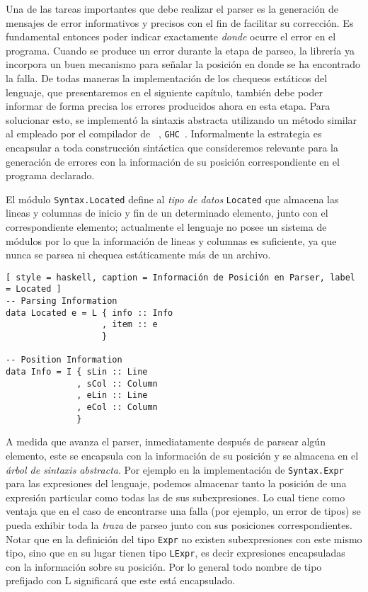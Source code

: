Una de las tareas importantes que debe realizar el parser es la generación de mensajes de error informativos y precisos con el fin de facilitar su corrección. Es fundamental entonces poder indicar exactamente  \textit{donde} ocurre el error en el programa.
Cuando se produce un error durante la etapa de parseo, la librería \Megaparsec{} ya incorpora un buen mecanismo para señalar la posición en donde se ha encontrado la falla.
De todas maneras la implementación de los chequeos estáticos del lenguaje, que presentaremos en el siguiente capítulo, también debe poder informar de forma precisa los errores producidos ahora en esta etapa.
Para solucionar esto, se implementó la sintaxis abstracta utilizando un método similar al empleado por el compilador de \Haskell{}~\cite{Haskell}, \texttt{GHC}~\cite{GHC}.
Informalmente la estrategia es encapsular a toda construcción sintáctica que consideremos relevante para la generación de errores con la información de su posición correspondiente en el programa declarado.

El módulo \lstinline[style = module]{Syntax.Located} define al \textit{tipo de datos} \lstinline[style = haskell]{Located} que almacena las lineas y columnas de inicio y fin de un determinado elemento, junto con el correspondiente elemento; actualmente el lenguaje no posee un sistema de módulos por lo que la información de lineas y columnas es suficiente, ya que nunca se parsea ni chequea estáticamente más de un archivo.

\begin{lstlisting}[ style = haskell, caption = Información de Posición en Parser, label = Located ]
-- Parsing Information
data Located e = L { info :: Info
                   , item :: e
                   }

-- Position Information
data Info = I { sLin :: Line
              , sCol :: Column
              , eLin :: Line
              , eCol :: Column
              }
\end{lstlisting}

A medida que avanza el parser, inmediatamente después de parsear algún elemento, este se encapsula con la información de su posición y se almacena en el \textit{árbol de sintaxis abstracta}.
Por ejemplo en la implementación de \lstinline[style = module]{Syntax.Expr} para las expresiones del lenguaje, podemos almacenar tanto la posición de una expresión particular como todas las de sus subexpresiones.
Lo cual tiene como ventaja que en el caso de encontrarse una falla (por ejemplo, un error de tipos) se pueda exhibir toda la \textit{traza} de parseo junto con sus posiciones correspondientes.
Notar que en la definición del tipo \lstinline[style = haskell]{Expr} no existen subexpresiones con este mismo tipo, sino que en su lugar tienen tipo \lstinline[style = haskell]{LExpr}, es decir expresiones encapsuladas con la información sobre su posición.
Por lo general todo nombre de tipo prefijado con {\ttfamily \color{Cyan} L} significará que este está encapsulado.

